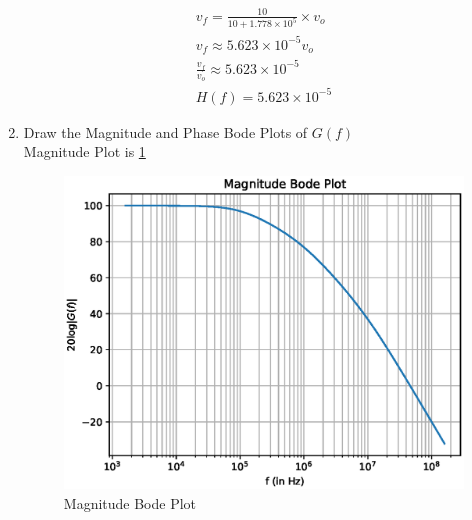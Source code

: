 \begin{enumerate}[label=\thesection.\arabic*.,ref=\thesection.\theenumi]
\begin{align}
v_{f} = \frac{10}{10 + 1.778\times 10^{5}} \times v_{o}\\
v_{f} \approx 5.623\times 10^{-5} v_{o}\\
\frac{v_{f}}{v_{o}} \approx 5.623\times 10^{-5}\\
H(f) = 5.623\times 10^{-5}
\end{align}

\item Draw the Magnitude and Phase Bode Plots of $G(f)$\\
\solution
Magnitude Plot is \ref{fig:Magnitude Plot}
\begin{figure}[ht!]
	\begin{center}
		\includegraphics[width=\columnwidth]{./figs/ee18btech11014/Magnitude_Plot.eps}
	\end{center}
	\caption{Magnitude Bode Plot}
	\label{fig:Magnitude Plot}
\end{figure}


\end{enumerate}
